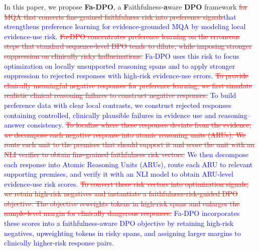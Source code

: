 \documentclass[a4paper,fleqn,doubleblind]{cas-sc}
\DeclareRobustCommand{\deleted}[1]{\textcolor{red}{\sout{#1}}}
\DeclareRobustCommand{\added}[1]{\textcolor{blue}{#1}}
\begin{document}
In this paper, we propose \textbf{Fa-DPO}, a \textbf{F}aithfulness-\textbf{a}ware \textbf{DPO} framework \deleted{for MQA that converts fine-grained faithfulness risk into preference signals}\added{that strengthens preference learning for evidence-grounded MQA by modeling local evidence-use risk}.
\deleted{Fa-DPO concentrates preference learning on the erroneous steps that standard sequence-level DPO tends to dilute, while imposing stronger suppression on clinically risky hallucinations.}
\added{Fa-DPO uses this risk to focus optimization on locally unsupported reasoning spans and to apply stronger suppression to rejected responses with high-risk evidence-use errors.}
\deleted{To provide clinically meaningful negative responses for preference learning, we first simulate realistic clinical reasoning failures to construct negative responses.}
\added{To build preference data with clear local contrasts, we construct rejected responses containing controlled, clinically plausible failures in evidence use and reasoning--answer consistency.}
\deleted{To localize where these responses deviate from the evidence, we decompose each negative response into atomic reasoning units (ARUs). We route each unit to the premises that should support it and score the unit with an NLI verifier to obtain fine-grained faithfulness risk vectors.}
\added{We then decompose each response into Atomic Reasoning Units (ARUs), route each ARU to relevant supporting premises, and verify it with an NLI model to obtain ARU-level evidence-use risk scores.}
\deleted{To convert these risk vectors into optimization signals, we retain high-risk negatives and instantiate a faithfulness-risk-guided DPO objective. The objective reweights tokens in high-risk spans and enlarges the sample-level margin for clinically dangerous responses.}
\added{Fa-DPO incorporates these scores into a faithfulness-aware DPO objective by retaining high-risk negatives, upweighting tokens in risky spans, and assigning larger margins to clinically higher-risk response pairs.}
\end{document}
